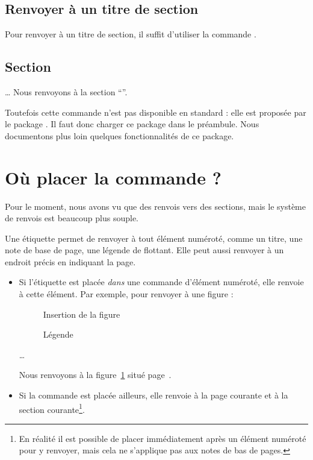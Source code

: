 \subsection{Renvoyer à un titre de section}\label{renvoititre}

Pour renvoyer à un titre de section, il suffit d'utiliser la commande .

\begin{latexcode}
\section{Section} \label{etiquette}
…
Nous renvoyons à la section  \enquote{}.
\end{latexcode}

Toutefois cette commande n'est pas disponible en standard : elle est proposée par le package . Il faut donc charger ce package dans le préambule. Nous documentons plus loin quelques fonctionnalités de ce package.


\section{Où placer la commande  ?}

Pour le moment, nous avons vu que des renvois vers des sections, mais le système de renvois est beaucoup plus souple.

Une étiquette permet de renvoyer à tout élément numéroté, comme un titre, une note de base de page, une légende de flottant. Elle peut aussi renvoyer à un endroit précis en indiquant la page.

\begin{itemize}
\item Si l'étiquette  est placée \emph{dans}  une commande  d'élément numéroté, elle renvoie à cette élément. Par exemple, pour renvoyer à une figure  :
\begin{latexcode}
\begin{figure}[paramètre de placement]
	Insertion de la figure
	\caption{Légende\label{figure}}
\end{figure} 
…

Nous renvoyons à la figure~\ref{figure} situé page~\pageref{figure}.
\end{latexcode}
\item Si la commande est placée ailleurs, elle renvoie à la page courante et à la section courante\footnote{En réalité il est possible de placer immédiatement après un élément numéroté pour y renvoyer, mais cela ne s'applique pas aux notes de bas de pages.}.
\end{itemize}

